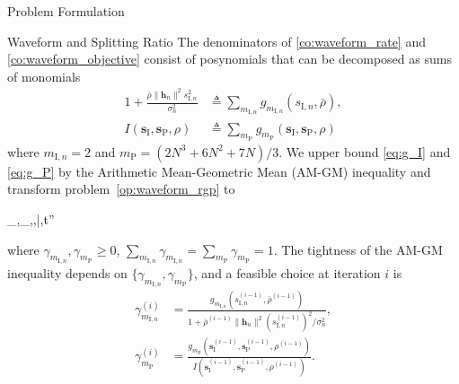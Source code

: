 \documentclass[journal]{IEEEtran}
\begin{document}
\begin{section}{Problem Formulation}
\begin{subsection}{Waveform and Splitting Ratio}
			The denominators of \eqref{co:waveform_rate} and \eqref{co:waveform_objective} consist of posynomials \cite{Boyd2007} that can be decomposed as sums of monomials
			\begin{align}
				1+\frac{\bar{\rho}\lVert{\boldsymbol{h}_n}\rVert^2 s_{\mathrm{I},n}^2}{\sigma_n^2} &\triangleq \sum_{m_{\mathrm{I},n}}g_{m_{\mathrm{I},n}}(s_{\mathrm{I},n},\bar{\rho})\label{eq:g_I},\\
				I(\boldsymbol{s}_{\mathrm{I}},\boldsymbol{s}_\mathrm{P},\rho) &\triangleq \sum_{m_\mathrm{P}}{g_{m_\mathrm{P}}(\boldsymbol{s}_{\mathrm{I}},\boldsymbol{s}_\mathrm{P},\rho)}\label{eq:g_P}
			\end{align}
			where $m_{\mathrm{I},n}=2$ and $m_\mathrm{P}=(2N^3+6N^2+7N)/3$. We upper bound \eqref{eq:g_I} and \eqref{eq:g_P} by the Arithmetic Mean-Geometric Mean (AM-GM) inequality \cite{Chiang2005} and transform problem~\eqref{op:waveform_rgp} to
			\begin{mini!}
				{_{},_,\rho,\bar{\rho},t''}{}{\label{op:waveform_gp}}{}
			\end{mini!}
			where $\gamma_{m_{\mathrm{I},n}},\gamma_{m_\mathrm{P}} \ge 0$, $\sum_{m_{\mathrm{I},n}}\gamma_{m_{\mathrm{I},n}}=\sum_{m_\mathrm{P}}\gamma_{m_\mathrm{P}}=1$. The tightness of the AM-GM inequality depends on $\{\gamma_{m_{\mathrm{I},n}},\gamma_{m_\mathrm{P}}\}$, and a feasible choice at iteration $i$ is
			\begin{align}
				\gamma_{m_{\mathrm{I},n}}^{(i)} & = \frac{g_{m_{\mathrm{I},n}}(s_{\mathrm{I},n}^{(i-1)},\bar{\rho}^{(i-1)})}{1+{\bar{\rho}^{(i-1)}\lVert{\boldsymbol{h}_n}\rVert^2 (s_{\mathrm{I},n}^{(i-1)})^2}\big/{\sigma_n^2}}\label{eq:gamma_I},\\
				\gamma_{m_\mathrm{P}}^{(i)} & = \frac{g_{m_\mathrm{P}}(\boldsymbol{s}_{\mathrm{I}}^{(i-1)},\boldsymbol{s}_\mathrm{P}^{(i-1)},\rho^{(i-1)})}{I(\boldsymbol{s}_{\mathrm{I}}^{(i-1)},\boldsymbol{s}_\mathrm{P}^{(i-1)},\rho^{(i-1)})}\label{eq:gamma_P}.
			\end{align}


\end{subsection}
\end{section}
\end{document}

